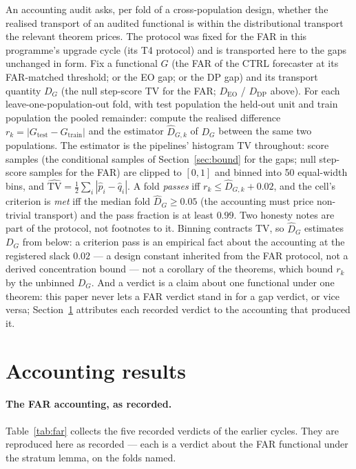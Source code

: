 \documentclass[11pt]{article}
\begin{document}
An accounting audit asks, per fold of a cross-population design,
whether the realised transport of an audited functional is within
the distributional transport the relevant theorem prices. The protocol was fixed for the FAR in this programme's upgrade cycle (its T4 protocol) and is transported here to the gaps unchanged in form. Fix a functional $G$ (the FAR
of the CTRL forecaster at its FAR-matched threshold; or the EO gap;
or the DP gap) and its transport quantity $D_G$ (the null
step-score TV for the FAR; $D_{\mathrm{EO}}$ / $D_{\mathrm{DP}}$
above). For each leave-one-population-out fold, with test
population the held-out unit and train population the pooled
remainder: compute the realised difference
$r_k = |G_{\mathrm{test}} - G_{\mathrm{train}}|$ and the estimator
$\hat D_{G,k}$ of $D_G$ between the same two populations. The
estimator is the pipelines' histogram TV throughout: score samples
(the conditional samples of Section~\ref{sec:bound} for the gaps;
null step-score samples for the FAR) are clipped to $[0,1]$ and
binned into 50 equal-width bins, and
$\hat{\mathrm{TV}} = \tfrac12 \sum_i |\hat p_i - \hat q_i|$.
A fold \emph{passes} iff $r_k \le \hat D_{G,k} + 0.02$, and the
cell's criterion is \emph{met} iff the median fold
$\hat D_G \ge 0.05$ (the accounting must price non-trivial
transport) and the pass fraction is at least $0.99$. Two honesty
notes are part of the protocol, not footnotes to it. Binning
contracts TV, so $\hat D_G$ estimates $D_G$ from below: a criterion
pass is an empirical fact about the accounting at the registered
slack $0.02$ --- a design constant inherited from the FAR protocol,
not a derived concentration bound --- not a corollary of the
theorems, which bound $r_k$ by the unbinned $D_G$. And a verdict is
a claim about one functional under one theorem: this paper never
lets a FAR verdict stand in for a gap verdict, or vice versa;
Section~\ref{sec:results} attributes each recorded verdict to the
accounting that produced it.

\section{Accounting results}
\label{sec:results}

\paragraph{The FAR accounting, as recorded.} Table~\ref{tab:far}
collects the five recorded verdicts of the earlier cycles. They are
reproduced here as recorded --- each is a verdict about the FAR
functional under the stratum lemma, on the folds named.
\end{document}
